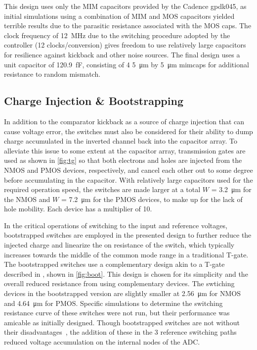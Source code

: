 \documentclass[11pt,letterpaper]{article}
\begin{document}
This design uses only the MIM capacitors provided by the Cadence gpdk045, as initial simulations using a combination of MIM and MOS capacitors yielded terrible results due to the parasitic resistance associated with the MOS caps. The clock frequency of \qty{12}{\MHz} due to the switching procedure adopted by the controller (12 clocks/conversion) gives freedom to use relatively large capacitors for resilience against kickback and other noise sources. The final design uses a unit capacitor of \qty{120.9}{\fF}, consisting of 4 \qty{5}{\um} by \qty{5}{\um} mimcaps for additional resistance to random mismatch. 

\subsection{Charge Injection \& Bootstrapping}

In addition to the comparator kickback as a source of charge injection that can cause voltage error, the switches must also be considered for their ability to dump charge accumulated in the inverted channel back into the capacitor array. To alleviate this issue to some extent at the capacitor array, transmission gates are used as shown in \cref{fig:tg} so that both electrons and holes are injected from the NMOS and PMOS devices, respectively, and cancel each other out to some degree before accumulating in the capacitor. With relatively large capacitors used for the required operation speed, the switches are made larger at a total \(W\) = \qty{3.2}{\um} for the NMOS and \(W\) = \qty{7.2}{\um} for the PMOS devices, to make up for the lack of hole mobility. Each device has a multiplier of 10.

In the critical operations of switching to the input and reference voltages, bootstrapped switches are employed in the presented design to further reduce the injected charge and linearize the on resistance of the switch, which typically increases towards the middle of the common mode range in a traditional T-gate\cite{Razavi2015,Bocharov2019}. The bootstrapped switches use a complementary design akin to a T-gate described in \cite{Sotoudeh2021}, shown in \cref{fig:boot}. This design is chosen for its simplicity and the overall reduced resistance from using complementary devices. The swtiching devices in the bootstrapped version are slightly smaller at \qty{2.56}{\um} for NMOS and \qty{4.64}{\um} for PMOS\@. Specific simulations to determine the switching resistance curve of these switches were not run, but their performance was amicable as initially designed. Though bootstrapped switches are not without their disadvantages~\cite{Yuan2021}, the addition of these in the 3 reference switching paths reduced voltage accumulation on the internal nodes of the ADC. 
\end{document}
